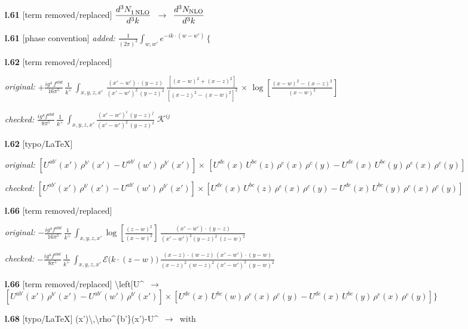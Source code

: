 \documentclass[10pt]{article}
\begin{document}
\begin{itemize}[leftmargin=2.2em,itemsep=1pt,topsep=2pt]
\item[\textbf{l.61}] \textsf{\small [term removed/replaced]} $\displaystyle \frac{d^{3}N_{1\,\rm NLO}^{\rm}}{d^{3}k}$\ $\longrightarrow$\ $\displaystyle \frac{d^{3}N_{\rm NLO}}{d^{3}k}$
\item[\textbf{l.61}] \textsf{\small [phase convention]} \emph{added:} $\displaystyle \frac{1}{(2\pi)^{3}}\int_{w,w'}e^{-ik\cdot(w-w')}\,\Bigg\{$
\item[\textbf{l.62}] \textsf{\small [term removed/replaced]} \par\noindent\emph{original:} $\displaystyle +\frac{ig^{4}\,f^{abd}}{16\pi^{5}}\, \frac{1}{k^{+}}\,\int_{x,y,z,x'}\, \frac{(x'-w')\cdot (y-z)}{(x'-w')^{2}\,(y-z)^{2}}\, \frac{[(x-w)^{2}+(x-z)^{2}]}{[(x-z)^{2}-(x-w)^{2}]^{2}}\, \times\, \log{[\frac{(x-w)^{2}-(x-z)^{2}}{(x-w)^{2}}]}$\par\noindent\emph{checked:} $\displaystyle \frac{ig^{4}f^{abd}}{8\pi^{5}}\,\frac{1}{k^{+}}\,\int_{x,y,z,x'}\frac{(x'-w')^{i}\,(y-z)^{j}}{(x'-w')^{2}\,(y-z)^{2}}\;\mathcal{K}^{ij}$
\item[\textbf{l.62}] \textsf{\small [typo/LaTeX]} \par\noindent\emph{original:} $\displaystyle [U^{ab'}(x')\,\rho^{b'}(x')-U^{ab'}(w')\, \rho^{b'}(x')]\times\, [U^{de}(x)\,U^{bc}(z)\, \rho^{e}(x)\,\rho^{c}(y)-U^{de}(x)\,U^{bc}(y)\,\rho^{e}(x)\,\rho^{c}(y)]$\par\noindent\emph{checked:} $\displaystyle [U^{ab'}(x')\,\rho^{b'}(x')-U^{ab'}(w')\, \rho^{b'}(x')]\times [U^{de}(x)\,U^{bc}(z)\, \rho^{e}(x)\,\rho^{c}(y)-U^{de}(x)\,U^{bc}(y)\,\rho^{e}(x)\,\rho^{c}(y)]$
\item[\textbf{l.66}] \textsf{\small [term removed/replaced]} \par\noindent\emph{original:} $\displaystyle -\frac{ig^{4}f^{abd}}{16\pi^{5}}\,\frac{1}{k^{+}}\,\int_{x,y,z,x'}\log{[\frac{(z-w)^{2}}{(x-w)^{2}}]}\,\frac{(x'-w')\cdot(y-z)}{(x'-w')^{2}(y-z)^{2}\,(z-w)^{2}}$\par\noindent\emph{checked:} $\displaystyle -\frac{ig^{4}f^{abd}}{8\pi^{5}}\,\frac{1}{k^{+}}\,\int_{x,y,z,x'}\mathcal{E}\big(k\cdot(z-w)\big)\,\frac{(x-z)\cdot(w-z)\,(x'-w')\cdot(y-w)}{(x-z)^{2}\,(w-z)^{2}\,(x'-w')^{2}\,(y-w)^{2}}$
\item[\textbf{l.66}] \textsf{\small [term removed/replaced]} {\small\ttfamily \textbackslash{}\allowbreak{}left[U\^{}}\ $\longrightarrow$\ $\displaystyle [U^{ab'}(x')\,\rho^{b'}(x')-U^{ab'}(w')\, \rho^{b'}(x')]\times [U^{de}(x)\,U^{bc}(w)\, \rho^{e}(x)\,\rho^{c}(y)-U^{de}(x)\,U^{bc}(y)\,\rho^{e}(x)\,\rho^{c}(y)]\Bigg\}$
\item[\textbf{l.68}] \textsf{\small [typo/LaTeX]} {\small\ttfamily (x')\allowbreak{}\textbackslash{}\allowbreak{},\allowbreak{}\textbackslash{}\allowbreak{}rho\^{}\{b'\}\allowbreak{}(x')\allowbreak{}-U\^{}}\ $\longrightarrow$\ with
\end{itemize}
\end{document}
